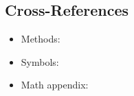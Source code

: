 \documentclass[
  13pt,
  a4paperpaper,
  12pt]{article}
\providecommand{\tightlist}{%
  \setlength{\itemsep}{0pt}\setlength{\parskip}{0pt}}
\begin{document}
\subsection{Cross-References}\label{cross-references}

\begin{itemize}
\tightlist
\item
  Methods: 
\item
  Symbols: 
\item
  Math appendix: 
\end{itemize}
\end{document}
